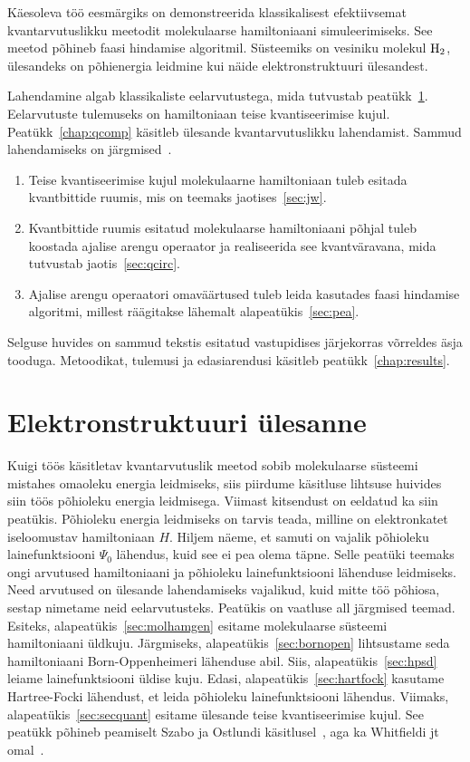 \documentclass[12pt]{report}
\begin{document}
Käesoleva töö eesmärgiks on demonstreerida klassikalisest efektiivsemat kvantarvutuslikku meetodit molekulaarse hamiltoniaani simuleerimiseks.
See meetod põhineb faasi hindamise algoritmil.
Süsteemiks on vesiniku molekul \(\rm H_2\), ülesandeks on põhienergia leidmine kui näide elektronstruktuuri ülesandest.

Lahendamine algab klassikaliste eelarvutustega, mida tutvustab peatükk~\ref{chap:qchem}.
Eelarvutuste tulemuseks on hamiltoniaan teise kvantiseerimise kujul.
Peatükk~\ref{chap:qcomp} käsitleb ülesande kvantarvutuslikku lahendamist.
Sammud lahendamiseks on järgmised~\cite{whitfield+etal2011}.

\begin{enumerate}
    \item Teise kvantiseerimise kujul molekulaarne hamiltoniaan tuleb esitada kvantbittide ruumis, mis on teemaks jaotises~\ref{sec:jw}.
    \item Kvantbittide ruumis esitatud molekulaarse hamiltoniaani põhjal tuleb koostada ajalise arengu operaator ja realiseerida see kvantväravana, mida tutvustab jaotis~\ref{sec:qcirc}.
    \item Ajalise arengu operaatori omaväärtused tuleb leida kasutades faasi hindamise algoritmi, millest räägitakse lähemalt alapeatükis~\ref{sec:pea}.
\end{enumerate}
Selguse huvides on sammud tekstis esitatud vastupidises järjekorras võrreldes äsja tooduga.
Metoodikat, tulemusi ja edasiarendusi käsitleb peatükk~\ref{chap:results}.

\chapter{Elektronstruktuuri ülesanne}\label{chap:qchem}

Kuigi töös käsitletav kvantarvutuslik meetod sobib molekulaarse süsteemi mistahes omaoleku energia leidmiseks, siis piirdume käsitluse lihtsuse huivides siin töös põhioleku energia leidmisega.
Viimast kitsendust on eeldatud ka siin peatükis.
Põhioleku energia leidmiseks on tarvis teada, milline on elektronkatet iseloomustav hamiltoniaan \(H\).
Hiljem näeme, et samuti on vajalik põhioleku lainefunktsiooni $\Psi_0$ lähendus, kuid see ei pea olema täpne.
Selle peatüki teemaks ongi arvutused hamiltoniaani ja põhioleku lainefunktsiooni lähenduse leidmiseks.
Need arvutused on ülesande lahendamiseks vajalikud, kuid mitte töö põhiosa, sestap nimetame neid eelarvutusteks.
Peatükis on vaatluse all järgmised teemad.
Esiteks, alapeatükis~\ref{sec:molhamgen} esitame molekulaarse süsteemi hamiltoniaani üld\-kuju.
Järgmiseks, alapeatükis~\ref{sec:bornopen} lihtsustame seda hamiltoniaani Born-Oppenheimeri lähenduse abil.
Siis, alapeatükis~\ref{sec:hpsd} leiame lainefunktsiooni üldise kuju.
Edasi, alapeatükis~\ref{sec:hartfock} kasutame Hartree-Focki lähendust, et leida põhioleku lainefunktsiooni lähendus.
Viimaks, alapeatükis~\ref{sec:secquant} esitame ülesande teise kvantiseerimise kujul.
See peatükk põhineb peamiselt Szabo ja Ostlundi käsitlusel~\cite{szabo+ostlund}, aga ka Whitfieldi jt omal~\cite{whitfield+etal2011}.
\end{document}
